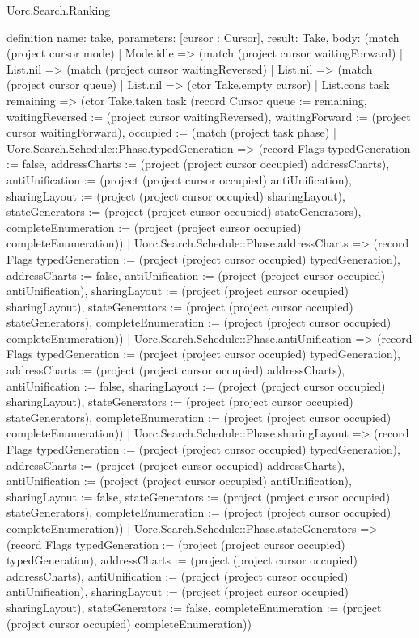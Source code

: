\begin{lexlean}{Uorc.Search.Ranking}
\begin{semanticmodule}
definition{
  name: take,
  parameters: [cursor : Cursor],
  result: Take,
  body: (match (project cursor mode)
    | Mode.idle => (match (project cursor waitingForward)
      | List.nil => (match (project cursor waitingReversed)
        | List.nil => (match (project cursor queue)
          | List.nil => (ctor Take.empty cursor)
          | List.cons task remaining => (ctor Take.taken task (record Cursor {queue := remaining, waitingReversed := (project cursor waitingReversed), waitingForward := (project cursor waitingForward), occupied := (match (project task phase)
            | Uorc.Search.Schedule::Phase.typedGeneration => (record Flags {typedGeneration := false, addressCharts := (project (project cursor occupied) addressCharts), antiUnification := (project (project cursor occupied) antiUnification), sharingLayout := (project (project cursor occupied) sharingLayout), stateGenerators := (project (project cursor occupied) stateGenerators), completeEnumeration := (project (project cursor occupied) completeEnumeration)})
            | Uorc.Search.Schedule::Phase.addressCharts => (record Flags {typedGeneration := (project (project cursor occupied) typedGeneration), addressCharts := false, antiUnification := (project (project cursor occupied) antiUnification), sharingLayout := (project (project cursor occupied) sharingLayout), stateGenerators := (project (project cursor occupied) stateGenerators), completeEnumeration := (project (project cursor occupied) completeEnumeration)})
            | Uorc.Search.Schedule::Phase.antiUnification => (record Flags {typedGeneration := (project (project cursor occupied) typedGeneration), addressCharts := (project (project cursor occupied) addressCharts), antiUnification := false, sharingLayout := (project (project cursor occupied) sharingLayout), stateGenerators := (project (project cursor occupied) stateGenerators), completeEnumeration := (project (project cursor occupied) completeEnumeration)})
            | Uorc.Search.Schedule::Phase.sharingLayout => (record Flags {typedGeneration := (project (project cursor occupied) typedGeneration), addressCharts := (project (project cursor occupied) addressCharts), antiUnification := (project (project cursor occupied) antiUnification), sharingLayout := false, stateGenerators := (project (project cursor occupied) stateGenerators), completeEnumeration := (project (project cursor occupied) completeEnumeration)})
            | Uorc.Search.Schedule::Phase.stateGenerators => (record Flags {typedGeneration := (project (project cursor occupied) typedGeneration), addressCharts := (project (project cursor occupied) addressCharts), antiUnification := (project (project cursor occupied) antiUnification), sharingLayout := (project (project cursor occupied) sharingLayout), stateGenerators := false, completeEnumeration := (project (project cursor occupied) completeEnumeration)})
}}
\end{semanticmodule}
\end{lexlean}

